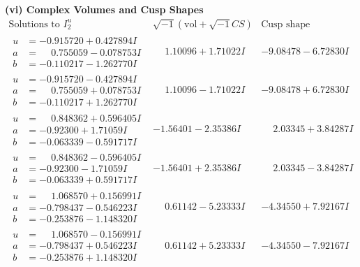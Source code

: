 \documentclass[1p]{elsarticle_modified}
\theoremstyle{definition}
\newcommand{\I}{\sqrt{-1}}
\begin{document}
\newpage\flushleft \textbf{(vi) Complex Volumes and Cusp Shapes}
$$\begin{array}{c|c|c}  
\text{Solutions to }I^u_{2}& \I (\text{vol} + \sqrt{-1}CS) & \text{Cusp shape}\\
 \hline 
\begin{aligned}
u &= -0.915720 + 0.427894 I \\
a &= \phantom{-}0.755059 - 0.078753 I \\
b &= -0.110217 - 1.262770 I\end{aligned}
 & \phantom{-}1.10096 + 1.71022 I & -9.08478 - 6.72830 I \\ \hline\begin{aligned}
u &= -0.915720 - 0.427894 I \\
a &= \phantom{-}0.755059 + 0.078753 I \\
b &= -0.110217 + 1.262770 I\end{aligned}
 & \phantom{-}1.10096 - 1.71022 I & -9.08478 + 6.72830 I \\ \hline\begin{aligned}
u &= \phantom{-}0.848362 + 0.596405 I \\
a &= -0.92300 + 1.71059 I \\
b &= -0.063339 - 0.591717 I\end{aligned}
 & -1.56401 - 2.35386 I & \phantom{-}2.03345 + 3.84287 I \\ \hline\begin{aligned}
u &= \phantom{-}0.848362 - 0.596405 I \\
a &= -0.92300 - 1.71059 I \\
b &= -0.063339 + 0.591717 I\end{aligned}
 & -1.56401 + 2.35386 I & \phantom{-}2.03345 - 3.84287 I \\ \hline\begin{aligned}
u &= \phantom{-}1.068570 + 0.156991 I \\
a &= -0.798437 - 0.546223 I \\
b &= -0.253876 - 1.148320 I\end{aligned}
 & \phantom{-}0.61142 - 5.23333 I & -4.34550 + 7.92167 I \\ \hline\begin{aligned}
u &= \phantom{-}1.068570 - 0.156991 I \\
a &= -0.798437 + 0.546223 I \\
b &= -0.253876 + 1.148320 I\end{aligned}
 & \phantom{-}0.61142 + 5.23333 I & -4.34550 - 7.92167 I \\ \hline\begin{aligned}

\end{aligned}
\end{array}$$
\end{document}

